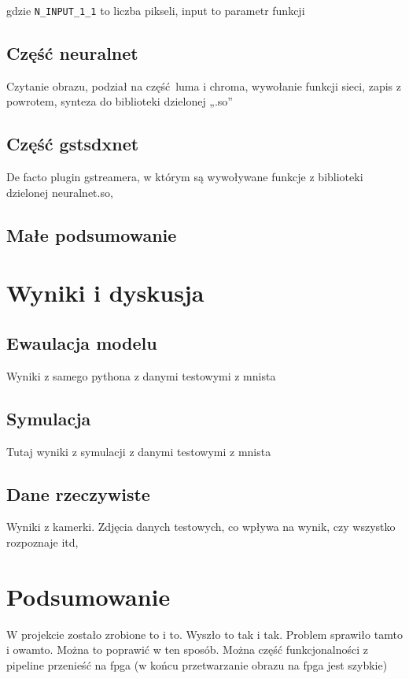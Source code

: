 \documentclass[12pt, oneside]{article}
\begin{document}
\begin{minipage}{\linewidth}

gdzie \lstinline{N_INPUT_1_1} to liczba pikseli,
input to parametr funkcji 
\end{minipage}



\subsection{Część neuralnet}
Czytanie obrazu, podział na część luma i chroma, wywołanie funkcji sieci,
zapis z powrotem, synteza do biblioteki dzielonej „.so”

\subsection{Część gstsdxnet}
De facto plugin gstreamera, w którym są wywoływane funkcje z biblioteki
dzielonej neuralnet.so, 

\subsection{Małe podsumowanie}


\newpage
\section{Wyniki i dyskusja}

\subsection{Ewaulacja modelu}
Wyniki z samego pythona z danymi testowymi z mnista

\subsection{Symulacja}
Tutaj wyniki z symulacji z danymi testowymi z mnista

\subsection{Dane rzeczywiste}
Wyniki z kamerki. Zdjęcia danych testowych, co wpływa na wynik, czy wszystko
rozpoznaje itd,

\newpage
\section{Podsumowanie}
W projekcie zostało zrobione to i to. Wyszło to tak i tak. Problem sprawiło
tamto i owamto. Można to poprawić w ten sposób. Można część funkcjonalności
z pipeline przenieść na fpga (w końcu przetwarzanie obrazu na fpga jest szybkie)
\end{document}
